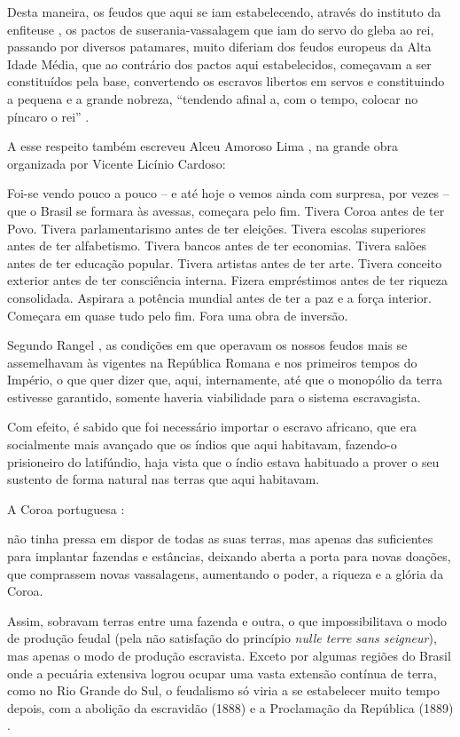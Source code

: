 \documentclass[
	12pt,				%
	oneside,			%
	a4paper,			%
	chapter=TITLE,		%
	section=TITLE,		%
	english,			%
	brazil				%
	]{abntex2}
\begin{document}
Desta maneira, os feudos que aqui se iam estabelecendo, através do
instituto da enfiteuse \autocite[726]{rangel1989}, os pactos de
suserania-vassalagem que iam do servo do gleba ao rei, passando por
diversos patamares, muito diferiam dos feudos europeus da Alta Idade
Média, que ao contrário dos pactos aqui estabelecidos, começavam a ser
constituídos pela base, convertendo os escravos libertos em servos e
constituindo a pequena e a grande nobreza, ``tendendo afinal a, com o
tempo, colocar no píncaro o rei'' \autocite[727]{rangel1989}.

A esse respeito também escreveu Alceu Amoroso Lima
\autocite*[51]{amoroso}, na grande obra organizada por Vicente Licínio
Cardoso:
\begin{citacao}
Foi-se vendo pouco a pouco – e até hoje o vemos ainda com surpresa, por vezes –
que o Brasil se formara às avessas, começara pelo fim. Tivera Coroa antes de ter
Povo. Tivera parlamentarismo antes de ter eleições. Tivera escolas superiores
antes de ter alfabetismo. Tivera bancos antes de ter economias. Tivera salões
antes de ter educação popular. Tivera artistas antes de ter arte. Tivera
conceito exterior antes de ter consciência interna. Fizera empréstimos antes de
ter riqueza consolidada. Aspirara a potência mundial antes de ter a paz e a
força interior. Começara em quase tudo pelo fim. Fora uma obra de inversão.
\end{citacao}
Segundo Rangel \autocite*[729]{rangel1989}, as condições em que operavam
os nossos feudos mais se assemelhavam às vigentes na República Romana e
nos primeiros tempos do Império, o que quer dizer que, aqui,
internamente, até que o monopólio da terra estivesse garantido, somente
haveria viabilidade para o sistema escravagista.

Com efeito, é sabido que foi necessário importar o escravo africano, que
era socialmente mais avançado que os índios que aqui habitavam,
fazendo-o prisioneiro do latifúndio, haja vista que o índio estava
habituado a prover o seu sustento de forma natural nas terras que aqui
habitavam.

A Coroa portuguesa \autocite[731]{rangel1989}:
\begin{citacao}
não tinha pressa em dispor de todas as suas terras, mas apenas das suficientes
para implantar fazendas e estâncias, deixando aberta a porta para novas doações,
que comprassem novas vassalagens, aumentando o poder, a riqueza e a glória da
Coroa.
\end{citacao}
Assim, sobravam terras entre uma fazenda e outra, o que impossibilitava
o modo de produção feudal (pela não satisfação do princípio \emph{nulle
terre sans seigneur}), mas apenas o modo de produção escravista. Exceto
por algumas regiões do Brasil onde a pecuária extensiva logrou ocupar
uma vasta extensão contínua de terra, como no Rio Grande do Sul, o
feudalismo só viria a se estabelecer muito tempo depois, com a abolição
da escravidão (1888) e a Proclamação da República (1889)
\autocite[732-733]{rangel1989}.
\end{document}
